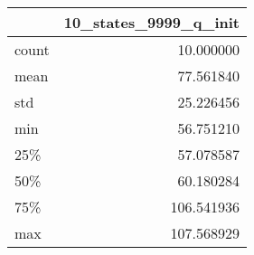 \begin{tabular}{lr}
\toprule
{} &  10\_states\_9999\_q\_init \\
\midrule
count &              10.000000 \\
mean  &              77.561840 \\
std   &              25.226456 \\
min   &              56.751210 \\
25\%   &              57.078587 \\
50\%   &              60.180284 \\
75\%   &             106.541936 \\
max   &             107.568929 \\
\bottomrule
\end{tabular}
